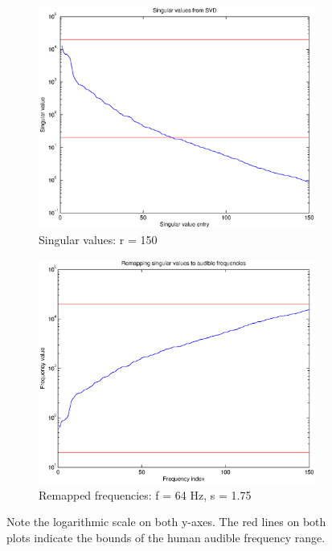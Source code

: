 \documentclass[11pt]{article}
\begin{document}
\begin{figure}
	\begin{subfigure}[h]{0.5\textwidth}
		\includegraphics[width=\textwidth]{figures/singulars.eps}
		\caption{Singular values: r = 150} 
		\label{fig:singulars}
	\end{subfigure}
	\begin{subfigure}[h]{0.5\textwidth}
		\includegraphics[width=\textwidth]{figures/remap_freqs.eps}
		\caption{Remapped frequencies: f = 64 Hz, s = 1.75}
		\label{fig:freqs}
	\end{subfigure}
	\caption{Note the logarithmic scale on both y-axes. The red lines on both plots indicate the bounds of the human audible frequency range.}
\end{figure}
\end{document}
